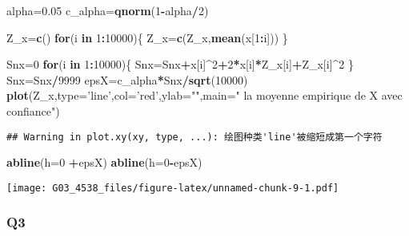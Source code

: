 \documentclass[]{article}
\newenvironment{Shaded}{\begin{snugshade}}{\end{snugshade}}
\newcommand{\KeywordTok}[1]{\textcolor[rgb]{0.13,0.29,0.53}{\textbf{#1}}}
\newcommand{\DataTypeTok}[1]{\textcolor[rgb]{0.13,0.29,0.53}{#1}}
\newcommand{\DecValTok}[1]{\textcolor[rgb]{0.00,0.00,0.81}{#1}}
\newcommand{\FloatTok}[1]{\textcolor[rgb]{0.00,0.00,0.81}{#1}}
\newcommand{\StringTok}[1]{\textcolor[rgb]{0.31,0.60,0.02}{#1}}
\newcommand{\ControlFlowTok}[1]{\textcolor[rgb]{0.13,0.29,0.53}{\textbf{#1}}}
\newcommand{\OperatorTok}[1]{\textcolor[rgb]{0.81,0.36,0.00}{\textbf{#1}}}
\newcommand{\NormalTok}[1]{#1}
\begin{document}
\begin{Shaded}
\begin{Highlighting}[]
\NormalTok{alpha=}\FloatTok{0.05}
\NormalTok{c_alpha=}\KeywordTok{qnorm}\NormalTok{(}\DecValTok{1}\OperatorTok{-}\NormalTok{alpha}\OperatorTok{/}\DecValTok{2}\NormalTok{)}

\NormalTok{Z_x=}\KeywordTok{c}\NormalTok{()}
\ControlFlowTok{for}\NormalTok{(i }\ControlFlowTok{in} \DecValTok{1}\OperatorTok{:}\DecValTok{10000}\NormalTok{)\{}
\NormalTok{  Z_x=}\KeywordTok{c}\NormalTok{(Z_x,}\KeywordTok{mean}\NormalTok{(x[}\DecValTok{1}\OperatorTok{:}\NormalTok{i]))}
\NormalTok{\}}

\NormalTok{Snx=}\DecValTok{0}  
\ControlFlowTok{for}\NormalTok{(i }\ControlFlowTok{in} \DecValTok{1}\OperatorTok{:}\DecValTok{10000}\NormalTok{)\{}
\NormalTok{  Snx=Snx}\OperatorTok{+}\NormalTok{x[i]}\OperatorTok{^}\DecValTok{2}\OperatorTok{+}\DecValTok{2}\OperatorTok{*}\NormalTok{x[i]}\OperatorTok{*}\NormalTok{Z_x[i]}\OperatorTok{+}\NormalTok{Z_x[i]}\OperatorTok{^}\DecValTok{2}
\NormalTok{\}}
\NormalTok{Snx=Snx}\OperatorTok{/}\DecValTok{9999}
\NormalTok{epsX=c_alpha}\OperatorTok{*}\NormalTok{Snx}\OperatorTok{/}\KeywordTok{sqrt}\NormalTok{(}\DecValTok{10000}\NormalTok{)}
\KeywordTok{plot}\NormalTok{(Z_x,}\DataTypeTok{type=}\StringTok{'line'}\NormalTok{,}\DataTypeTok{col=}\StringTok{'red'}\NormalTok{,}\DataTypeTok{ylab=}\StringTok{""}\NormalTok{,}\DataTypeTok{main=}\StringTok{" la moyenne empirique de X avec confiance"}\NormalTok{)}
\end{Highlighting}
\end{Shaded}

\begin{verbatim}
## Warning in plot.xy(xy, type, ...): 绘图种类'line'被缩短成第一个字符
\end{verbatim}

\begin{Shaded}
\begin{Highlighting}[]
\KeywordTok{abline}\NormalTok{(}\DataTypeTok{h=}\DecValTok{0} \OperatorTok{+}\NormalTok{epsX)}
\KeywordTok{abline}\NormalTok{(}\DataTypeTok{h=}\DecValTok{0}\OperatorTok{-}\NormalTok{epsX)}
\end{Highlighting}
\end{Shaded}

\texttt{[image: G03\_4538\_files/figure-latex/unnamed-chunk-9-1.pdf]}

\subsubsection{Q3}\label{q3-1}
\end{document}
